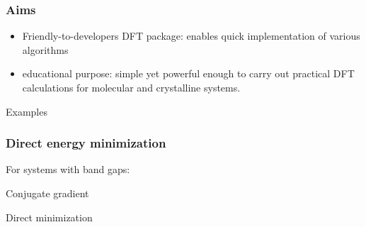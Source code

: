 \documentclass[english,9pt]{beamer}
\begin{document}
\begin{frame}
\frametitle{Aims}

\begin{itemize}
\item Friendly-to-developers DFT package: enables quick implementation of various algorithms
\item educational purpose: simple yet powerful enough to carry out practical DFT calculations
for molecular and crystalline systems.
\end{itemize}

\end{frame}

\begin{frame}[plain]
\begin{center}
\Huge{Examples}
\end{center}
\end{frame}





\begin{frame}
\frametitle{Direct energy minimization}

For systems with band gaps:

Conjugate gradient

Direct minimization

\end{frame}
\end{document}
